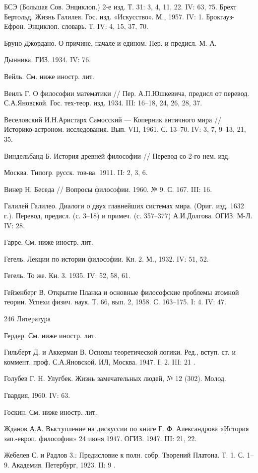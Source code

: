БСЭ (Большая Сов. Энциклоп.) 2-е изд. Т. 31: 3, 4, 11, 22. IV: 63, 75.
Брехт Бертольд. Жизнь Галилея. Гос. изд. «Искусство». М., 1957. IV: 1.
Брокгауз-Ефрон. Энциклоп. словарь. Т. IV: 4, 15, 37, 70.

Бруно Джордано. О причине, начале и едином. Пер. и предисл. М. А.

Дынника. ГИЗ. 1934. IV: 76.

Вейль. См. ниже иностр. лит.

Веилъ  Г. О  философии  математики //  Пер.  А.П.Юшкевича, предисл  от
перевод. С.А.Яновской. Гос. тех-теор. изд.  1934. III: 16--18, 24, 26,
28, 37.

Веселовский  И.Н.Аристарх Самосский  ---  Коперник  античного мира  //
Историко-астроном. исследования. Вып. VII, 1961.  С. 13--70. IV: 3, 7,
9--13, 21, 35.

Виндельбанд Б. История древней философии // Перевод со 2-го нем. изд.

Москва. Типогр. русск. тов-ва. 1911. II: 2, 3, 6.

Винер Н. Беседа // Вопросы философии. 1960. № 9. С. 167. III: 16.

Галилей Галилео. Диалоги о двух  главнейших системах мира. (Ориг. изд.
1632  г.).  Перевод,  предисл.  (с. 3--18)  и  примеч.  (с.  357--377)
А.И.Долгова. ОГИЗ. М-Л. IV: 28.

Гарре. См. ниже иностр. лит.

Гегель. Лекции по истории философии. Кн. 2. М., 1932. IV: 51, 52.

Гегель. То же. Кн. 3. 1935. IV: 52, 58, 61.

Гейзенберг В. Открытие Планка  и основные философские проблемы атомной
теории. Успехи  физич. наук. Т. 66,  вып. 2, 1958. С.  163--175. I: 4.
IV: 47.

246 Литература

Гердер. См. ниже иностр. лит.

Гильберт Д.  и Аккерман В.  Основы теоретической логики.  Ред., вступ.
ст. и коммент. проф. С.А.Яновской. ИЛ, Москва. 1947. I: 2. III: 21   .

Голубев Г. Н. Улугбек. Жизнь замечательных людей, № 12 (302). Молод.

Гвардия, I960. IV: 63.

Госкин. См. ниже иностр. лит.

Жданов  А.А. Выступление  на  дискуссии по  книге  Г. Ф.  Александрова
«История зап.-европ. философии» 24 июня 1947. ОГИЗ. 1947. III: 21, 22.

Жебелев С. и Радлов 3.: Предисловие к полн. собр. Творений Платона. Т.
1. С. 1--9. Академия. Петербург, 1923. II: 9                         .


